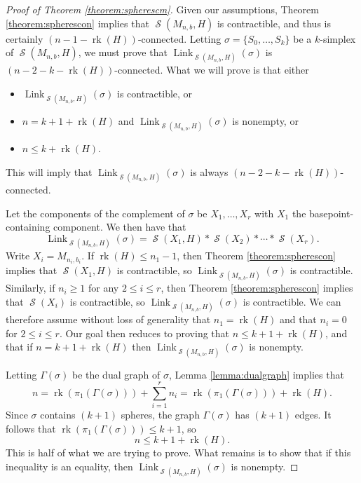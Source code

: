 \documentclass[11pt]{amsart}
\numberwithin{equation}{section}
\theoremstyle{plain}
\theoremstyle{definition}
\theoremstyle{remark}
\DeclareMathOperator{\rank}{rk}
\DeclareMathOperator{\Spheres}{\mathcal{S}}
\DeclareMathOperator{\Link}{Link}
\begin{document}
\begin{proof}[Proof of Theorem \ref{theorem:spherescm}]
Given our assumptions, Theorem \ref{theorem:spherescon} implies that $\Spheres(M_{n,b},H)$
is contractible, and thus is certainly $(n-1-\rank(H))$-connected.  Letting $\sigma = \{S_0,\ldots,S_k\}$
be a $k$-simplex of $\Spheres(M_{n,b},H)$, we must prove that $\Link_{\Spheres(M_{n,b},H)}(\sigma)$
is $(n-2-k-\rank(H))$-connected.  What we will prove is that either
\begin{itemize}
\item $\Link_{\Spheres(M_{n,b},H)}(\sigma)$ is contractible, or
\item $n = k + 1 + \rank(H)$ and $\Link_{\Spheres(M_{n,b},H)}(\sigma)$ is nonempty, or
\item $n \leq k + \rank(H)$.
\end{itemize}
This will imply that $\Link_{\Spheres(M_{n,b},H)}(\sigma)$ is always $(n-2-k-\rank(H))$-connected.

Let the components of the complement of $\sigma$ be
$X_1,\ldots,X_r$ with $X_1$ the basepoint-containing component.  We then have that
\[\Link_{\Spheres(M_{n,b},H)}(\sigma) = \Spheres(X_1,H) \ast \Spheres(X_2) \ast \cdots \ast \Spheres(X_r).\]
Write $X_i = M_{n_i,b_i}$.  If $\rank(H) \leq n_1 - 1$, then Theorem \ref{theorem:spherescon} implies
that $\Spheres(X_1,H)$ is contractible, so $\Link_{\Spheres(M_{n,b},H)}(\sigma)$ is contractible.
Similarly, if $n_i \geq 1$ for
any $2 \leq i \leq r$, then Theorem \ref{theorem:spherescon} implies that
$\Spheres(X_i)$ is contractible, so $\Link_{\Spheres(M_{n,b},H)}(\sigma)$ is contractible.
We can therefore assume without loss of generality that $n_1 = \rank(H)$ and that $n_i = 0$ for
$2 \leq i \leq r$.  Our goal then reduces to proving that
$n \leq k + 1 + \rank(H)$, and that if $n = k + 1 + \rank(H)$ then $\Link_{\Spheres(M_{n,b},H)}(\sigma)$
is nonempty.

Letting $\Gamma(\sigma)$ be the dual graph of $\sigma$, Lemma \ref{lemma:dualgraph} implies that
\[n = \rank(\pi_1(\Gamma(\sigma))) + \sum_{i=1}^r n_i = \rank(\pi_1(\Gamma(\sigma))) + \rank(H).\]
Since $\sigma$ contains $(k+1)$ spheres, the graph $\Gamma(\sigma)$ has $(k+1)$ edges.  It follows
that $\rank(\pi_1(\Gamma(\sigma))) \leq k+1$, so
\[n \leq k+1 + \rank(H).\]
This is half of what we are trying to prove.  What remains is to show that if this inequality
is an equality, then $\Link_{\Spheres(M_{n,b},H)}(\sigma)$
is nonempty.


\end{proof}
\end{document}
